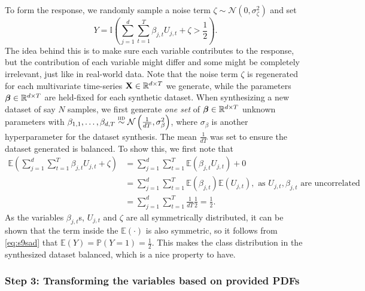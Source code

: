 \documentclass{statsmsc}
\begin{document}
{To form the response, we randomly sample a noise term $\zeta \sim \mathcal{N}(0,\sigma_\zeta^2)$
and set
\begin{equation}
    Y=\mathbb{I}\left(\sum^{d}_{j=1} \sum^{T}_{t=1} \beta_{j,t} U_{j,t}+\zeta > \frac{1}{2}  \right).
\end{equation}
The idea behind this is to make sure each variable contributes to the response, but the contribution
of each variable might differ and some might be completely irrelevant, just like in real-world
data.
Note that the noise term $\zeta$ 
is regenerated for each multivariate time-series $\mathbf{X} \in \mathbb{R}^{d \times T}$
we generate, while the
parameters $\bm\beta \in \mathbb{R}^{d \times T}$ are held-fixed for each synthetic dataset.
When synthesizing a new dataset of say $N$ samples, we first generate \textit{one set} of
$\bm\beta \in \mathbb{R}^{d \times T}$ unknown parameters with
$\beta_{1,1},\dots,\beta_{d,T} \stackrel{\textsc{iid}}{\sim} \mathcal{N}\left(\frac{1}{dT},\sigma_{\beta}^2\right)$, where
$\sigma_\beta$ is another hyperparameter for the dataset synthesis. The mean $\frac{1}{dT}$
was set to
ensure the dataset generated is balanced. To show this, we first note that
\begin{align}
    \mathbb{E}\left(
        \sum^{d}_{j=1} \sum^{T}_{t=1} \beta_{j,t} U_{j,t}+\zeta
    \right)
    &=\sum^{d}_{j=1} \sum^{T}_{t=1}  \mathbb{E}\left(\beta_{j,t} U_{j,t} \right)+0 \nonumber\\
    &=\sum^{d}_{j=1} \sum^{T}_{t=1}  \mathbb{E}\left(\beta_{j,t}\right)
    \mathbb{E}\left(U_{j,t} \right), \textrm{ as } U_{j,t}, \beta_{j,t}\textrm{ are uncorrelated}\nonumber \\
    &=\sum^{d}_{j=1} \sum^{T}_{t=1} \frac{1}{dT} \frac{1}{2} =\frac{1}{2} \label{eq:s9sad}.
\end{align}
As the variables $\beta_{j,t}$s, $U_{j,t}$ and $\zeta$ are all symmetrically distributed, it can
be shown that the term inside the $\mathbb{E}(\cdot)$ is also symmetric, so it follows from
\cref{eq:s9sad} that $\mathbb{E}(Y)=\mathbb{P}(Y=1)=\frac{1}{2}$. This makes the class distribution in the
synthesized dataset balanced, which is a nice property to have.

\subsubsection{Step 3: Transforming the variables based on provided PDFs}%
\label{ssub:Step 3: Estimating the inverse CDF}

}
\end{document}
